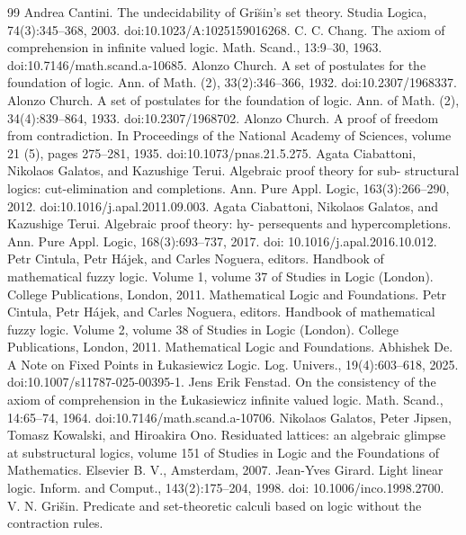 \documentclass[10pt,a4paper]{article}
\begin{document}
\begin{thebibliography}{99}
 Andrea Cantini. The undecidability of Gris̆in’s set theory. Studia Logica, 74(3):345–368, 2003.
doi:10.1023/A:1025159016268.
 C. C. Chang. The axiom of comprehension in infinite valued logic. Math. Scand., 13:9–30,
1963. doi:10.7146/math.scand.a-10685.
 Alonzo Church. A set of postulates for the foundation of logic. Ann. of Math. (2), 33(2):346–366,
1932. doi:10.2307/1968337.
 Alonzo Church. A set of postulates for the foundation of logic. Ann. of Math. (2), 34(4):839–864,
1933. doi:10.2307/1968702.
 Alonzo Church. A proof of freedom from contradiction. In Proceedings of the National Academy
of Sciences, volume 21 (5), pages 275–281, 1935. doi:10.1073/pnas.21.5.275.
 Agata Ciabattoni, Nikolaos Galatos, and Kazushige Terui. Algebraic proof theory for sub-
structural logics: cut-elimination and completions. Ann. Pure Appl. Logic, 163(3):266–290,
2012. doi:10.1016/j.apal.2011.09.003.
 Agata Ciabattoni, Nikolaos Galatos, and Kazushige Terui. Algebraic proof theory: hy-
persequents and hypercompletions. Ann. Pure Appl. Logic, 168(3):693–737, 2017. doi:
10.1016/j.apal.2016.10.012.
 Petr Cintula, Petr Hájek, and Carles Noguera, editors. Handbook of mathematical fuzzy
logic. Volume 1, volume 37 of Studies in Logic (London). College Publications, London, 2011.
Mathematical Logic and Foundations.
 Petr Cintula, Petr Hájek, and Carles Noguera, editors. Handbook of mathematical fuzzy
logic. Volume 2, volume 38 of Studies in Logic (London). College Publications, London, 2011.
Mathematical Logic and Foundations.
 Abhishek De. A Note on Fixed Points in Łukasiewicz Logic. Log. Univers., 19(4):603–618,
2025. doi:10.1007/s11787-025-00395-1.
 Jens Erik Fenstad. On the consistency of the axiom of comprehension in the Łukasiewicz
infinite valued logic. Math. Scand., 14:65–74, 1964. doi:10.7146/math.scand.a-10706.
 Nikolaos Galatos, Peter Jipsen, Tomasz Kowalski, and Hiroakira Ono. Residuated lattices: an
algebraic glimpse at substructural logics, volume 151 of Studies in Logic and the Foundations
of Mathematics. Elsevier B. V., Amsterdam, 2007.
 Jean-Yves Girard. Light linear logic. Inform. and Comput., 143(2):175–204, 1998. doi:
10.1006/inco.1998.2700.
 V. N. Grišin. Predicate and set-theoretic calculi based on logic without the contraction rules.

\end{thebibliography}
\end{document}
